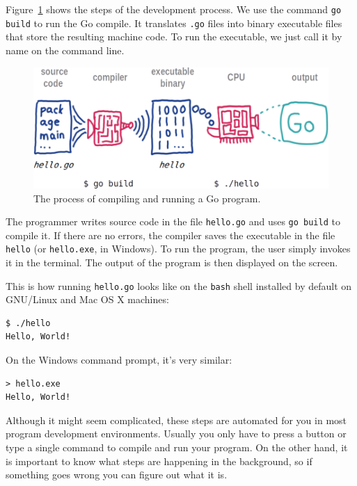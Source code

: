 Figure~\ref{fig.compiler} shows the steps of the development process.
We use the command {\tt go build} to run the Go compile.
It translates {\tt .go} files into binary executable files that store the resulting machine code.
To run the executable, we just call it by name on the command line.

\begin{figure}[!ht]
\begin{center}
\includegraphics{figs/compiler.png}
\caption{The process of compiling and running a Go program.}
\label{fig.compiler}
\end{center}
\end{figure}

The programmer writes source code in the file {\tt hello.go} and uses {\tt go build} to compile it.
If there are no errors, the compiler saves the executable in the file {\tt hello} (or {\tt hello.exe}, in Windows).
To run the program, the user simply invokes it in the terminal.
The output of the program is then displayed on the screen.

This is how running {\tt hello.go} looks like on the {\tt bash} shell installed by default on GNU/Linux and Mac OS X machines:

\begin{verbatim}
$ ./hello 
Hello, World!
\end{verbatim}

On the Windows command prompt, it's very similar:

\begin{verbatim}
> hello.exe 
Hello, World!
\end{verbatim}


Although it might seem complicated, these steps are automated for you in most program development environments.
Usually you only have to press a button or type a single command to compile and run your program.
On the other hand, it is important to know what steps are happening in the background,
so if something goes wrong you can figure out what it is.



